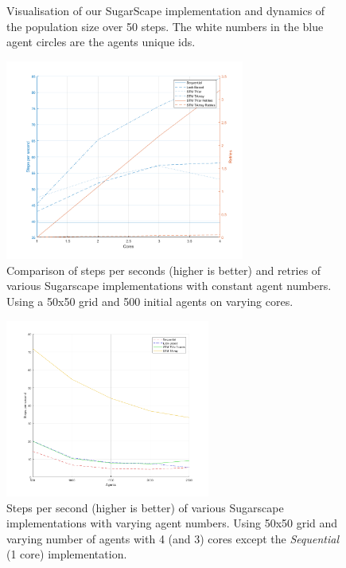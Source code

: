 \documentclass{bmcart}
\begin{document}
\begin{backmatter}
\begin{figure}[h!]
\begin{center}
	\caption{Visualisation of our SugarScape implementation and dynamics of the population size over 50 steps. The white numbers in the blue agent circles are the agents unique ids.}
	\label{fig:vis_sugarscape}
\end{center}
\end{figure}

\begin{figure}[h!]
	\includegraphics[width=0.7\textwidth, angle=0]{./sug_varying_cores.png}
	\caption{Comparison of steps per seconds (higher is better) and retries of various Sugarscape implementations with constant agent numbers. Using a 50x50 grid and 500 initial agents on varying cores.}
	\label{fig:varying_cores}
\end{figure}

\begin{figure}[h!]
	\includegraphics[width=0.6\textwidth, angle=0]{./sug_varying_agents.png}
	\caption{Steps per second (higher is better) of various Sugarscape implementations with varying agent numbers. Using 50x50 grid and varying number of agents with 4 (and 3) cores except the \textit{Sequential} (1 core) implementation.}
	\label{fig:state_results_agentsscale_time}
\end{figure}



\end{backmatter}
\end{document}
